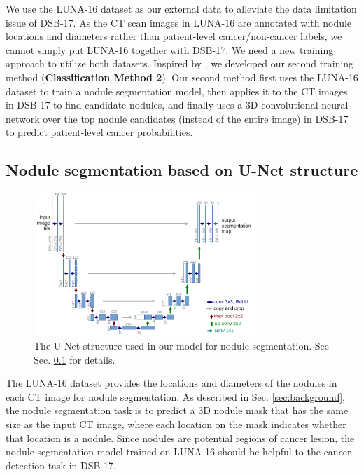 \documentclass{article}
\begin{document}
We use the LUNA-16 dataset \cite{setio2016validation} as our external data to alleviate the data limitation issue of DSB-17. As the CT scan images in LUNA-16 are annotated with nodule locations and diameters rather than patient-level cancer/non-cancer labels, we cannot simply put LUNA-16 together with DSB-17. We need a new training approach to utilize both datasets. Inspired by \cite{no7}, we developed our second training method (\textbf{Classification Method 2}). Our second method first uses the LUNA-16 dataset to train a nodule segmentation model, then applies it to the CT images in DSB-17 to find candidate nodules, and finally uses a 3D convolutional neural network over the top nodule candidates (instead of the entire image) in DSB-17 to predict patient-level cancer probabilities.

\subsection{Nodule segmentation based on U-Net structure}
\label{sec:nodule_seg_unet}

\begin{figure}[t]
  \centering
  \includegraphics[width=0.75\textwidth]{figures/unet.pdf}
  \caption{The U-Net structure \cite{ronneberger2015u} used in our model for nodule segmentation. See Sec. \ref{sec:nodule_seg_unet} for details.}
  \label{fig:unet}
\end{figure}

The LUNA-16 dataset provides the locations and diameters of the nodules in each CT image for nodule segmentation. As described in Sec. \ref{sec:background}, the nodule segmentation task is to predict a 3D nodule mask that has the same size as the input CT image, where each location on the mask indicates whether that location is a nodule. Since nodules are potential regions of cancer lesion, the nodule segmentation model trained on LUNA-16 should be helpful to the cancer detection task in DSB-17.
\end{document}
